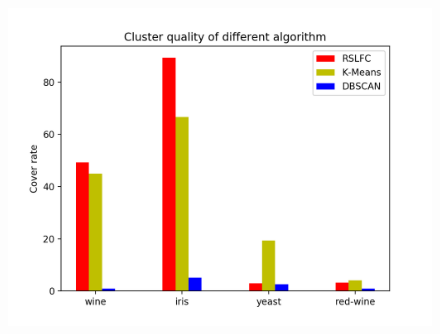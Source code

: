 \documentclass{article}
\begin{document}
\begin{figure}[h!]
	\centering
	\includegraphics[scale=0.8]{hist1.png}
\end{figure}




\end{document}
